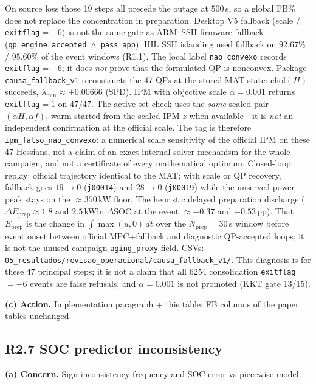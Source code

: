 \documentclass[11pt]{article}
\begin{document}
On source loss those 19 steps all precede the outage at $500$\,s, so a global FB\% does not replace the concentration in preparation. Desktop V5 fallback (scale / \texttt{exitflag}$=-6$) is not the same gate as ARM--SSH firmware fallback (\texttt{qp\_engine\_accepted}~$\wedge$~\texttt{pass\_app}). HIL SSH islanding used fallback on $92.67\%$ / $95.60\%$ of the event windows (R1.1). The local label \texttt{nao\_convexo} records \texttt{exitflag}$=-6$; it does \emph{not} prove that the formulated QP is nonconvex. Package \texttt{causa\_fallback\_v1} reconstructs the 47 QPs at the stored MAT state: $\mathrm{chol}(H)$ succeeds, $\lambda_{\min}\approx +0.00666$ (SPD). IPM with objective scale $\alpha=0.001$ returns \texttt{exitflag}$=1$ on $47/47$. The active-set check uses the \emph{same} scaled pair $(\alpha H,\alpha f)$, warm-started from the scaled IPM $z$ when available---it is \emph{not} an independent confirmation at the official scale. The tag is therefore \texttt{ipm\_falso\_nao\_convexo}: a numerical scale sensitivity of the official IPM on these 47 Hessians, not a claim of an exact internal solver mechanism for the whole campaign, and not a certificate of every mathematical optimum. Closed-loop replay: official trajectory identical to the MAT; with scale or QP recovery, fallback goes $19\to 0$ (\texttt{j00014}) and $28\to 0$ (\texttt{j00019}) while the unserved-power peak stays on the $\approx 350$\,kW floor. The heuristic delayed preparation discharge ($\Delta E_{\mathrm{prep}}\approx 1.8$ and $2.5$\,kWh; $\Delta\mathrm{SOC}$ at the event $\approx -0.37$ and $-0.53$\,pp). That $E_{\mathrm{prep}}$ is the change in $\int \max(u,0)\,dt$ over the $N_{\mathrm{prep}}=30$\,s window before event onset between official MPC+fallback and diagnostic QP-accepted loops; it is not the unused campaign \texttt{aging\_proxy} field. CSVs: \texttt{05\_resultados/revisao\_operacional/causa\_fallback\_v1/}. This diagnosis is for these 47 principal steps; it is not a claim that all $6254$ consolidation \texttt{exitflag}$=-6$ events are false refusals, and $\alpha=0.001$ is not promoted (KKT gate 13/15).

\textbf{(c) Action.} Implementation paragraph + this table; FB columns of the paper tables unchanged.

\subsection*{R2.7 SOC predictor inconsistency}
\textbf{(a) Concern.} Sign inconsistency frequency and SOC error vs piecewise model.
\end{document}
